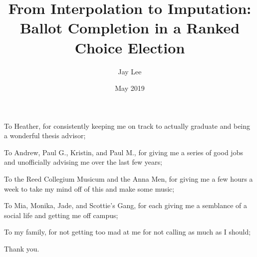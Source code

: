 \documentclass[12pt,twoside]{reedthesis}
\title{From Interpolation to Imputation: Ballot Completion in a Ranked Choice Election}
\author{Jay Lee}
\date{May 2019}
\begin{document}
  \maketitle

\frontmatter %
\pagestyle{empty} %
  \begin{acknowledgements}
    To Heather, for consistently keeping me on track to actually graduate and being a wonderful thesis advisor;
    
    \par
     \bigskip
    
    \noindent To Andrew, Paul G., Kristin, and Paul M., for giving me a series of good jobs and unofficially advising me over the last few years;
    
    \par
     \bigskip
    
    \noindent To the Reed Collegium Musicum and the Anna Men, for giving me a few hours a week to take my mind off of this and make some music;
    
    \par
     \bigskip
    
    \noindent To Mia, Monika, Jade, and Scottie's Gang, for each giving me a semblance of a social life and getting me off campus;
    
    \par
     \bigskip
    
    \noindent To my family, for not getting too mad at me for not calling as much as I should;
    
    \par
     \bigskip
    
    \noindent Thank you.
  \end{acknowledgements}
\end{document}
